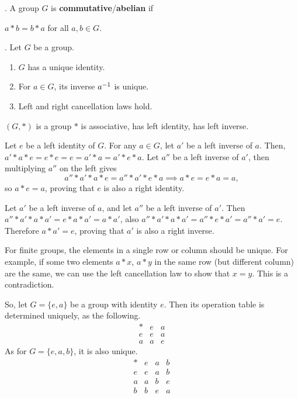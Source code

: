 .  A group \(G\) is \textbf{commutative}/\textbf{abelian} if
\begin{center}
    \(a * b = b * a\) for all \(a, b \in G\).
\end{center}

\prop.  Let \(G\) be a group.
\begin{enumerate}
    \item \(G\) has a unique identity.
    \item For \(a \in G\), its inverse \(a^{-1}\) is unique.
    \item Left and right cancellation laws hold.
\end{enumerate}

\rmk \((G, *)\) is a group \miff \(*\) is associative, has left identity, has left inverse.

\pf \note{\mimpd} Let \(e\) be a left identity of \(G\). For any \(a \in G\), let \(a'\) be a left inverse of \(a\). Then, \(a' * a * e = e * e = e = a' * a = a' * e * a\). Let \(a''\) be a left inverse of \(a'\), then multiplying \(a''\) on the left gives
\[
    a'' * a' * a * e = a'' * a' * e * a \implies a * e = e * a = a,
\]
so \(a * e = a\), proving that \(e\) is also a right identity.

Let \(a'\) be a left inverse of \(a\), and let \(a''\) be a left inverse of \(a'\). Then \(a'' * a' * a * a' = e * a * a' = a * a'\), also \(a'' * a' * a * a' = a'' * e * a' = a'' * a' = e\). Therefore \(a * a' = e\), proving that \(a'\) is also a right inverse.

\rmk For finite groups, the elements in a single row or column should be unique. For example, if some two elements \(a * x\), \(a * y\) in the same row (but different column) are the same, we can use the left cancellation law to show that \(x = y\). This is a contradiction.

So, let \(G = \{e, a\}\) be a group with identity \(e\). Then its operation table is determined uniquely, as the following.
\[
    \begin{array}{c|c|c}
        * & e & a \\ \hline
        e & e & a \\ \hline
        a & a & e
    \end{array}
\]
As for \(G = \{e, a, b\}\), it is also unique.
\[
    \begin{array}{c|c|c|c}
        * & e & a & b \\ \hline
        e & e & a & b \\ \hline
        a & a & b & e \\ \hline
        b & b & e & a
    \end{array}
\]

\pagebreak
